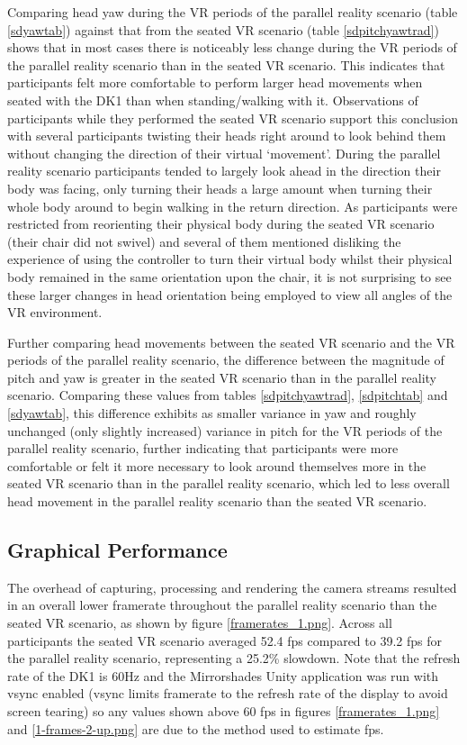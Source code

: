 Comparing head yaw during the VR periods of the parallel reality scenario (table \ref{sdyawtab}) against that from the seated VR scenario (table \ref{sdpitchyawtrad}) shows that in most cases there is noticeably less change during the VR periods of the parallel reality scenario than in the seated VR scenario. This indicates that participants felt more comfortable to perform larger head movements when seated with the DK1 than when standing/walking with it. Observations of participants while they performed the seated VR scenario support this conclusion with several participants twisting their heads right around to look behind them without changing the direction of their virtual `movement'. During the parallel reality scenario participants tended to largely look ahead in the direction their body was facing, only turning their heads a large amount when turning their whole body around to begin walking in the return direction. As participants were restricted from reorienting their physical body during the seated VR scenario (their chair did not swivel) and several of them mentioned disliking the experience of using the controller to turn their virtual body whilst their physical body remained in the same orientation upon the chair, it is not surprising to see these larger changes in head orientation being employed to view all angles of the VR environment.

Further comparing head movements between the seated VR scenario and the VR periods of the parallel reality scenario, the difference between the magnitude of pitch and yaw is greater in the seated VR scenario than in the parallel reality scenario. Comparing these values from tables \ref{sdpitchyawtrad}, \ref{sdpitchtab} and \ref{sdyawtab}, this difference exhibits as smaller variance in yaw and roughly unchanged (only slightly increased) variance in pitch for the VR periods of the parallel reality scenario, further indicating that participants were more comfortable or felt it more necessary to look around themselves more in the seated VR scenario than in the parallel reality scenario, which led to less overall head movement in the parallel reality scenario than the seated VR scenario.


\subsection{Graphical Performance}
\label{stage-1-framerates}
The overhead of capturing, processing and rendering the camera streams resulted in an overall lower framerate throughout the parallel reality scenario than the seated VR scenario, as shown by figure \ref{framerates_1.png}. Across all participants the seated VR scenario averaged 52.4 fps compared to 39.2 fps for the parallel reality scenario, representing a 25.2\% slowdown. Note that the refresh rate of the DK1 is 60Hz and the Mirrorshades Unity application was run with vsync enabled (vsync limits framerate to the refresh rate of the display to avoid screen tearing) so any values shown above 60 fps in figures \ref{framerates_1.png} and \ref{1-frames-2-up.png} are due to the method used to estimate fps.

